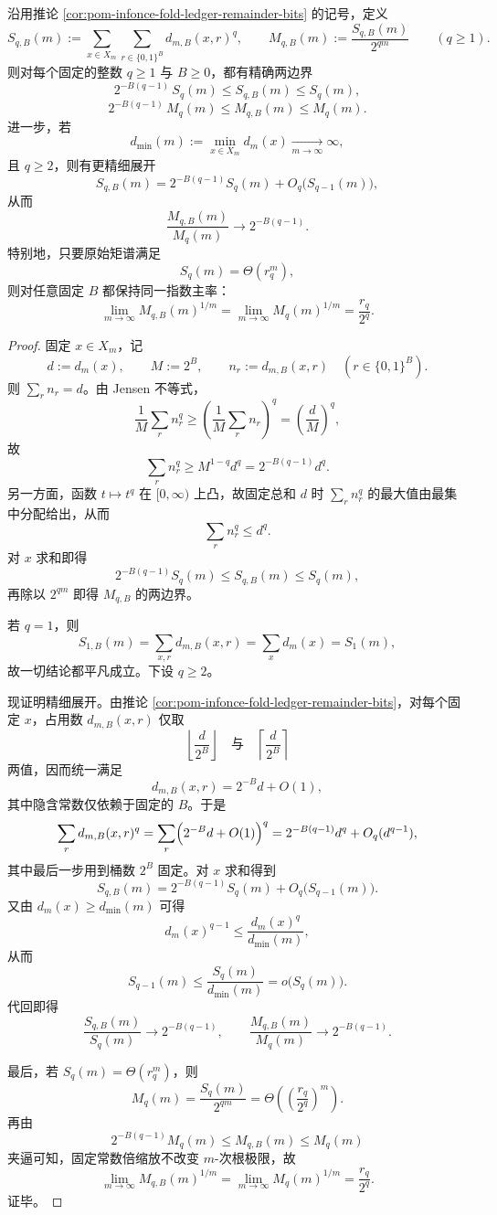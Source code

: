 \begin{theorem}\label{thm:pom-remainder-bits-all-renyi-compression-law}
沿用推论 \ref{cor:pom-infonce-fold-ledger-remainder-bits} 的记号，定义
\[
S_{q,B}(m):=\sum_{x\in X_m}\sum_{r\in\{0,1\}^B} d_{m,B}(x,r)^q,
\qquad
M_{q,B}(m):=\frac{S_{q,B}(m)}{2^{qm}}
\qquad(q\ge 1).
\]
则对每个固定的整数 \(q\ge 1\) 与 \(B\ge 0\)，都有精确两边界
\[
\boxed{
2^{-B(q-1)}\,S_q(m)\le S_{q,B}(m)\le S_q(m),
}
\]
\[
\boxed{
2^{-B(q-1)}\,M_q(m)\le M_{q,B}(m)\le M_q(m).
}
\]
进一步，若
\[
d_{\min}(m):=\min_{x\in X_m}d_m(x)\xrightarrow[m\to\infty]{}\infty,
\]
且 \(q\ge 2\)，则有更精细展开
\[
S_{q,B}(m)=2^{-B(q-1)}S_q(m)+O_q\!\bigl(S_{q-1}(m)\bigr),
\]
从而
\[
\frac{M_{q,B}(m)}{M_q(m)}\longrightarrow 2^{-B(q-1)}.
\]
特别地，只要原始矩谱满足
\[
S_q(m)=\Theta(r_q^m),
\]
则对任意固定 \(B\) 都保持同一指数主率：
\[
\boxed{
\lim_{m\to\infty}M_{q,B}(m)^{1/m}
=
\lim_{m\to\infty}M_q(m)^{1/m}
=
\frac{r_q}{2^q}.
}
\]
\end{theorem}
\begin{proof}
固定 \(x\in X_m\)，记
\[
d:=d_m(x),
\qquad
M:=2^B,
\qquad
n_r:=d_{m,B}(x,r)\quad(r\in\{0,1\}^B).
\]
则 \(\sum_r n_r=d\)。由 Jensen 不等式，
\[
\frac1M\sum_r n_r^q\ge \left(\frac1M\sum_r n_r\right)^q=\left(\frac{d}{M}\right)^q,
\]
故
\[
\sum_r n_r^q\ge M^{1-q}d^q=2^{-B(q-1)}d^q.
\]
另一方面，函数 \(t\mapsto t^q\) 在 \([0,\infty)\) 上凸，故固定总和 \(d\) 时 \(\sum_r n_r^q\) 的最大值由最集中分配给出，从而
\[
\sum_r n_r^q\le d^q.
\]
对 \(x\) 求和即得
\[
2^{-B(q-1)}S_q(m)\le S_{q,B}(m)\le S_q(m),
\]
再除以 \(2^{qm}\) 即得 \(M_{q,B}\) 的两边界。

若 \(q=1\)，则
\[
S_{1,B}(m)=\sum_{x,r}d_{m,B}(x,r)=\sum_x d_m(x)=S_1(m),
\]
故一切结论都平凡成立。下设 \(q\ge 2\)。

现证明精细展开。由推论 \ref{cor:pom-infonce-fold-ledger-remainder-bits}，对每个固定 \(x\)，占用数 \(d_{m,B}(x,r)\) 仅取
\[
\left\lfloor \frac{d}{2^B}\right\rfloor
\quad\text{与}\quad
\left\lceil \frac{d}{2^B}\right\rceil
\]
两值，因而统一满足
\[
d_{m,B}(x,r)=2^{-B}d+O(1),
\]
其中隐含常数仅依赖于固定的 \(B\)。于是
\[
\sum_r d_{m,B}(x,r)^q
=
\sum_r\Bigl(2^{-B}d+O(1)\Bigr)^q
=
2^{-B(q-1)}d^q+O_q(d^{q-1}),
\]
其中最后一步用到桶数 \(2^B\) 固定。对 \(x\) 求和得到
\[
S_{q,B}(m)=2^{-B(q-1)}S_q(m)+O_q\!\bigl(S_{q-1}(m)\bigr).
\]
又由 \(d_m(x)\ge d_{\min}(m)\) 可得
\[
d_m(x)^{q-1}\le \frac{d_m(x)^q}{d_{\min}(m)},
\]
从而
\[
S_{q-1}(m)\le \frac{S_q(m)}{d_{\min}(m)}=o\!\bigl(S_q(m)\bigr).
\]
代回即得
\[
\frac{S_{q,B}(m)}{S_q(m)}\longrightarrow 2^{-B(q-1)},
\qquad
\frac{M_{q,B}(m)}{M_q(m)}\longrightarrow 2^{-B(q-1)}.
\]

最后，若 \(S_q(m)=\Theta(r_q^m)\)，则
\[
M_q(m)=\frac{S_q(m)}{2^{qm}}=\Theta\!\left(\left(\frac{r_q}{2^q}\right)^m\right).
\]
再由
\[
2^{-B(q-1)}M_q(m)\le M_{q,B}(m)\le M_q(m)
\]
夹逼可知，固定常数倍缩放不改变 \(m\)-次根极限，故
\[
\lim_{m\to\infty}M_{q,B}(m)^{1/m}
=
\lim_{m\to\infty}M_q(m)^{1/m}
=
\frac{r_q}{2^q}.
\]
证毕。
\end{proof}

